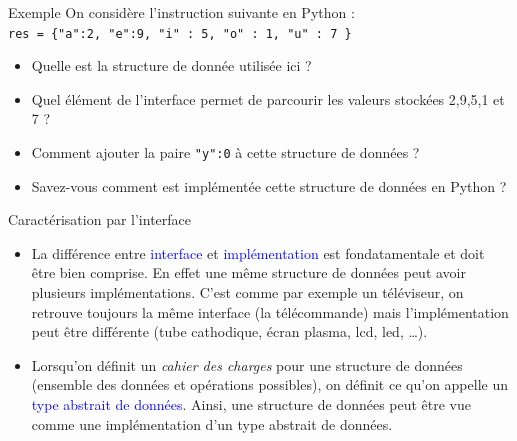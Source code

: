 \documentclass[10pt]{beamer}
\begin{document}
\begin{frame}{\SL}
	\mframe{\SL}
	\begin{exampleblock}{Exemple}
		On considère l'instruction suivante en Python : \\
		{\tt res = \{"a":2, "e":9, "i" : 5, "o" : 1, "u" : 7 \}}
		\begin{itemize}
			\item<1-> Quelle est la structure de donnée utilisée ici ?
			\item<2-> Quel élément de l'interface permet de parcourir les valeurs stockées 2,9,5,1 et 7 ?
			\item<3-> Comment ajouter la paire {\tt "y":0} à cette structure de données ?
			\item<4-> Savez-vous comment est implémentée cette structure de données en Python ?
		\end{itemize}
	\end{exampleblock}
\end{frame}

\begin{frame}{\SL}
	\mframe{\SL}
	\begin{alertblock}{Caractérisation par l'interface}
		\begin{itemize}
			\item<1-> La différence entre \textcolor{blue}{interface} et \textcolor{blue}{implémentation} est fondatamentale et doit être bien comprise. En effet une même structure de données peut avoir plusieurs implémentations. C'est comme par exemple un téléviseur, on retrouve toujours la même interface (la télécommande) mais l'implémentation peut être différente (tube cathodique, écran plasma, lcd, led, \dots).
			\item<2-> Lorsqu'on définit un \textit{cahier des charges} pour une structure de données (ensemble des données et opérations possibles), on définit ce qu'on appelle un \textcolor{blue}{type abstrait de données}.  Ainsi, une structure de données peut être vue comme une implémentation d'un type abstrait de données.
		\end{itemize}
	\end{alertblock}
\end{frame}
\end{document}
